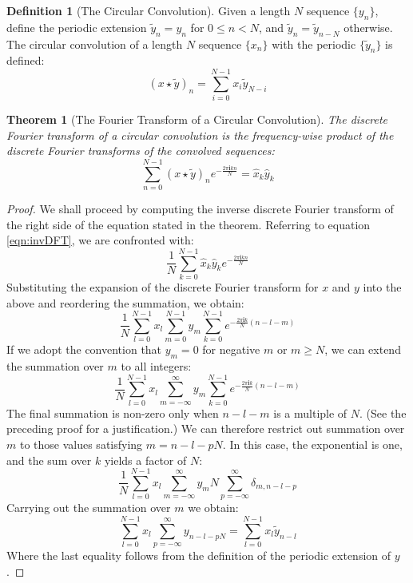 \documentclass{article}
\newcommand{\ii}{\mathbf{i}}
\newtheorem{theorem}{Theorem}[section]
\theoremstyle{definition}
\newtheorem{definition}{Definition}
\begin{document}
\begin{definition}[The Circular Convolution]
Given a length $N$ sequence $\{y_n\}$, define the periodic extension
$\tilde{y}_n = y_n$ for $0 \leq n < N$, and $\tilde{y}_n = \tilde{y}_{n - N}$
otherwise. The circular convolution of a length $N$ sequence $\{x_n\}$ with the
periodic $\{\tilde{y}_n\}$ is defined:
\begin{equation}
  (x \star \tilde{y})_n = \sum_{i = 0}^{N-1} x_i \tilde{y}_{N - i}
\end{equation}
\end{definition}
\begin{theorem}[The Fourier Transform of a Circular Convolution\cite{walkerFFT}]
The discrete Fourier transform of a circular convolution is the frequency-wise
product of the discrete Fourier transforms of the convolved sequences:
\begin{equation}
  \sum_{n = 0}^{N-1} (x \star \tilde{y})_n e^{-\frac{2 \pi \ii k n}{N}} =
\hat{x}_k \hat{y}_k
\end{equation}
\end{theorem}
\begin{proof}
We shall proceed by computing the inverse discrete Fourier transform of the
right side of the equation stated in the theorem. Referring to equation
\eqref{eqn:invDFT}, we are confronted with:
\begin{displaymath}
  \frac{1}{N} \sum_{k=0}^{N-1} \hat{x}_k \hat{y}_k e^{-\frac{2 \pi \ii k n}{N}}
\end{displaymath}
Substituting the expansion of the discrete Fourier transform for $x$ and $y$
into the above and reordering the summation, we obtain:
\begin{displaymath}
  \frac{1}{N} \sum_{l=0}^{N-1} x_l \sum_{m=0}^{N-1} y_m \sum_{k=0}^{N-1}
  e^{-\frac{2 \pi \ii k}{N}(n - l - m)}
\end{displaymath}
If we adopt the convention that $y_m = 0$ for negative $m$ or $m \geq N$, we can
extend the summation over $m$ to all integers:
\begin{displaymath}
  \frac{1}{N} \sum_{l=0}^{N-1} x_l \sum_{m=-\infty}^{\infty} y_m \sum_{k=0}^{N-1}
  e^{-\frac{2 \pi \ii k}{N}(n - l - m)}
\end{displaymath}
The final summation is non-zero only when $n - l - m$ is a multiple of $N$. (See
the preceding proof for a justification.) We can therefore restrict out
summation over $m$ to those values satisfying $m = n - l - pN$. In this case,
the exponential is one, and the sum over $k$ yields a factor of $N$:
\begin{displaymath}
  \frac{1}{N} \sum_{l=0}^{N-1} x_l \sum_{m=-\infty}^{\infty} y_m N
  \sum_{p=-\infty}^{\infty} \delta_{m,n - l - p}
\end{displaymath}
Carrying out the summation over $m$ we obtain:
\begin{displaymath}
  \sum_{l=0}^{N-1} x_l \sum_{p=-\infty}^{\infty} y_{n - l - pN} =
  \sum_{l=0}^{N-1} x_l \tilde{y}_{n - l}
\end{displaymath}
Where the last equality follows from the definition of the periodic extension of
$y$.
\end{proof}
\end{document}

